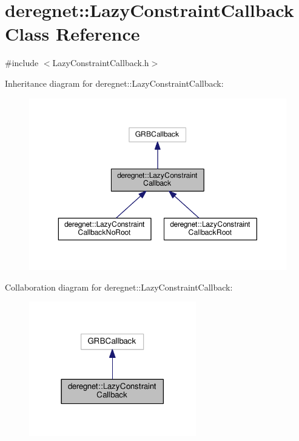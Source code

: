 \hypertarget{classderegnet_1_1LazyConstraintCallback}{}\section{deregnet\+:\+:Lazy\+Constraint\+Callback Class Reference}
\label{classderegnet_1_1LazyConstraintCallback}


{\ttfamily \#include $<$Lazy\+Constraint\+Callback.\+h$>$}



Inheritance diagram for deregnet\+:\+:Lazy\+Constraint\+Callback\+:\nopagebreak
\begin{figure}[H]
\begin{center}
\leavevmode
\includegraphics[width=350pt]{classderegnet_1_1LazyConstraintCallback__inherit__graph}
\end{center}
\end{figure}


Collaboration diagram for deregnet\+:\+:Lazy\+Constraint\+Callback\+:\nopagebreak
\begin{figure}[H]
\begin{center}
\leavevmode
\includegraphics[width=206pt]{classderegnet_1_1LazyConstraintCallback__coll__graph}
\end{center}
\end{figure}
